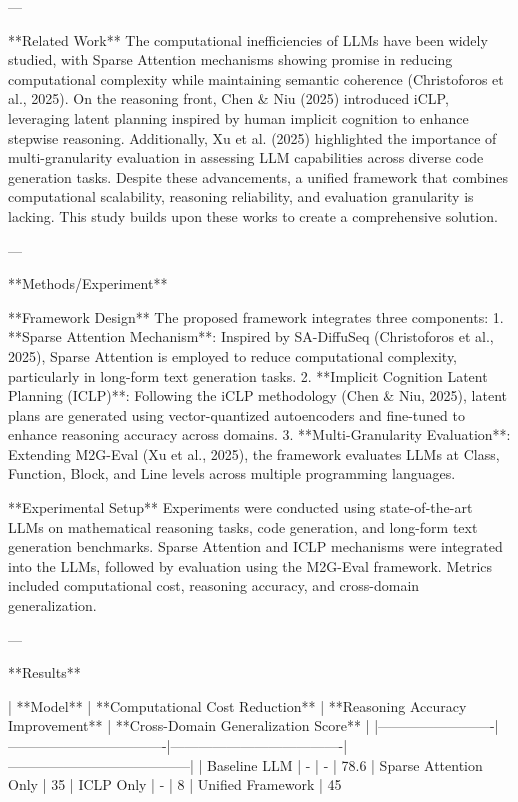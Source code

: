 ---

**Related Work**  
The computational inefficiencies of LLMs have been widely studied, with Sparse Attention mechanisms showing promise in reducing computational complexity while maintaining semantic coherence (Christoforos et al., 2025). On the reasoning front, Chen & Niu (2025) introduced iCLP, leveraging latent planning inspired by human implicit cognition to enhance stepwise reasoning. Additionally, Xu et al. (2025) highlighted the importance of multi-granularity evaluation in assessing LLM capabilities across diverse code generation tasks. Despite these advancements, a unified framework that combines computational scalability, reasoning reliability, and evaluation granularity is lacking. This study builds upon these works to create a comprehensive solution.  

---

**Methods/Experiment**  

**Framework Design**  
The proposed framework integrates three components:  
1. **Sparse Attention Mechanism**: Inspired by SA-DiffuSeq (Christoforos et al., 2025), Sparse Attention is employed to reduce computational complexity, particularly in long-form text generation tasks.  
2. **Implicit Cognition Latent Planning (ICLP)**: Following the iCLP methodology (Chen & Niu, 2025), latent plans are generated using vector-quantized autoencoders and fine-tuned to enhance reasoning accuracy across domains.  
3. **Multi-Granularity Evaluation**: Extending M2G-Eval (Xu et al., 2025), the framework evaluates LLMs at Class, Function, Block, and Line levels across multiple programming languages.  

**Experimental Setup**  
Experiments were conducted using state-of-the-art LLMs on mathematical reasoning tasks, code generation, and long-form text generation benchmarks. Sparse Attention and ICLP mechanisms were integrated into the LLMs, followed by evaluation using the M2G-Eval framework. Metrics included computational cost, reasoning accuracy, and cross-domain generalization.  

---

**Results**  

| **Model**              | **Computational Cost Reduction** | **Reasoning Accuracy Improvement** | **Cross-Domain Generalization Score** |  
|-------------------------|----------------------------------|-------------------------------------|---------------------------------------|  
| Baseline LLM            | -                              | -                                   | 78.6%
| Sparse Attention Only   | 35%
| ICLP Only               | -                              | 8%
| Unified Framework       | 45%

